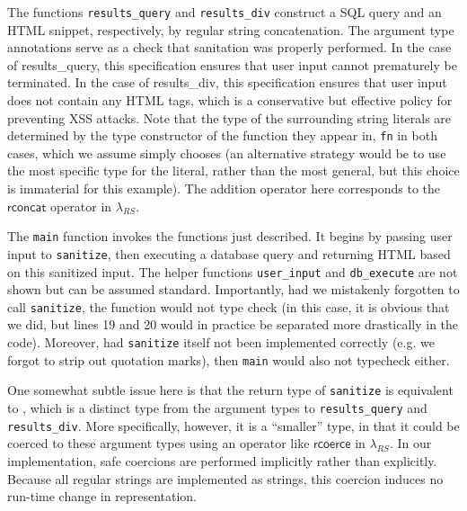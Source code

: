 \documentclass[9pt]{sig-alternate}
\theoremstyle{definition}
\begin{document}
The functions \verb|results_query| and \verb|results_div| construct a SQL query and an HTML snippet, respectively, by regular string concatenation. The argument type annotations serve as a check that sanitation was properly performed. In the case of \textsf{results_query}, this specification ensures that user input cannot prematurely be terminated. 
In the case of \textsf{results_div}, this specification ensures that user input does 
not contain any HTML tags, which is a conservative but effective policy for preventing XSS attacks. Note that the type of the surrounding string literals are determined by the type constructor of the function they appear in, \verb|fn| in both cases, which we assume simply chooses  (an alternative strategy would be to use the most specific type for the literal, rather than the most general, but this choice is immaterial for this example). The addition operator here corresponds to the $\textsf{rconcat}$ operator in $\lambda_{RS}$.



The \verb|main| function invokes the functions just described. It begins by passing  user input to \verb|sanitize|, then executing a database query and returning HTML based on this sanitized input. The helper functions \verb|user_input| and \verb|db_execute| are not shown but can be assumed standard. Importantly, had we mistakenly forgotten to call \verb|sanitize|, the function would not type check (in this case, it is obvious that we did, but lines 19 and 20 would in practice be separated more drastically in the code). Moreover, had \verb|sanitize| itself not been implemented correctly (e.g. we forgot to strip out quotation marks), then \verb|main| would also not typecheck either.

One somewhat subtle issue here is that the return type of \verb|sanitize| is equivalent to , which is a distinct type from the argument types to \verb|results_query| and \verb|results_div|. More specifically, however, it is a ``smaller'' type, in that it could be coerced to these argument types using an operator like $\textsf{rcoerce}$ in $\lambda_{RS}$. In our implementation, safe coercions are performed implicitly rather than explicitly. Because all regular strings are implemented as strings, this coercion induces no run-time change in representation. 

\end{document}
